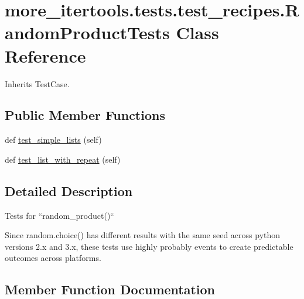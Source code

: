 \hypertarget{classmore__itertools_1_1tests_1_1test__recipes_1_1_random_product_tests}{}\section{more\+\_\+itertools.\+tests.\+test\+\_\+recipes.\+Random\+Product\+Tests Class Reference}
\label{classmore__itertools_1_1tests_1_1test__recipes_1_1_random_product_tests}


Inherits Test\+Case.

\subsection*{Public Member Functions}
\begin{DoxyCompactItemize}
\item 
def \hyperlink{classmore__itertools_1_1tests_1_1test__recipes_1_1_random_product_tests_a67d44670f2f8e8ffa4ce4e17814aca61}{test\+\_\+simple\+\_\+lists} (self)
\item 
def \hyperlink{classmore__itertools_1_1tests_1_1test__recipes_1_1_random_product_tests_a78465ed31f025ae2209c509e6492247a}{test\+\_\+list\+\_\+with\+\_\+repeat} (self)
\end{DoxyCompactItemize}


\subsection{Detailed Description}
\begin{DoxyVerb}Tests for ``random_product()``

Since random.choice() has different results with the same seed across
python versions 2.x and 3.x, these tests use highly probably events to
create predictable outcomes across platforms.
\end{DoxyVerb}
 

\subsection{Member Function Documentation}
\mbox{\label{classmore__itertools_1_1tests_1_1test__recipes_1_1_random_product_tests_a78465ed31f025ae2209c509e6492247a}} 
